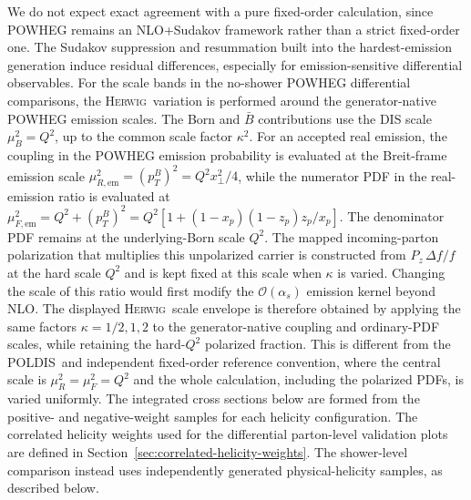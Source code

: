 \documentclass[a4paper,11pt]{article}
\newcommand{\Herwig}{\textsc{Herwig}}
\newcommand{\POLDIS}{\textsc{POLDIS}}
\begin{document}
We do not expect exact agreement with a pure fixed-order calculation, since \textsc{POWHEG}
remains an NLO+Sudakov framework rather than a strict fixed-order one.
The Sudakov suppression and resummation built into the hardest-emission
generation induce residual differences, especially for
emission-sensitive differential observables.
For the scale bands in the no-shower POWHEG differential comparisons, the
\Herwig\ variation is performed around the generator-native POWHEG emission
scales.  The Born and $\bar B$ contributions use the DIS scale
$\mu_B^2=Q^2$, up to the common scale factor $\kappa^2$.  For an accepted real
emission, the coupling in the POWHEG emission probability is evaluated at the
Breit-frame emission scale
$\mu_{R,\mathrm{em}}^2=(p_{T}^{B})^2=Q^2 x_\perp^2/4$, while the numerator PDF in the
real-emission ratio is evaluated at
$\mu_{F,\mathrm{em}}^2=Q^2+(p_{T}^{B})^2
=Q^2[1+(1-x_p)(1-z_p)z_p/x_p]$. The denominator PDF remains at the
underlying-Born scale $Q^2$.  The mapped incoming-parton polarization that
multiplies this unpolarized carrier is constructed from
$P_z\,\Delta f/f$ at the hard scale $Q^2$ and is kept fixed at this scale when
$\kappa$ is varied.  Changing the scale of this ratio would first modify the
$\mathcal{O}(\alpha_s)$ emission kernel beyond NLO.  The displayed \Herwig\
scale envelope is therefore obtained by applying the same factors
$\kappa=1/2,1,2$ to the generator-native coupling and ordinary-PDF scales,
while retaining the hard-$Q^2$ polarized fraction.  This is different from the
\POLDIS\ and independent fixed-order reference convention, where the central
scale is $\mu_R^2=\mu_F^2=Q^2$ and the whole calculation, including the
polarized PDFs, is varied uniformly.
The integrated cross sections below are formed from the positive- and
negative-weight samples for each helicity configuration. The correlated
helicity weights used for the differential parton-level validation plots are
defined in Section~\ref{sec:correlated-helicity-weights}. The shower-level
comparison instead uses independently generated physical-helicity samples, as
described below.
\end{document}

